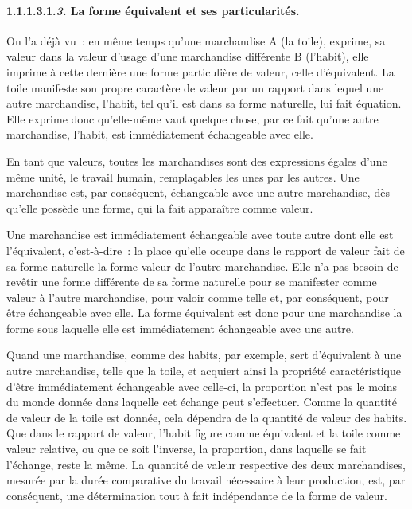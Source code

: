 \documentclass[french,twoside]{book} %
\begin{document}
\paragraph[{1.1.1.3.1.3. La forme équivalent et ses particularités.}]{1.1.1.3.1.\textbf{\emph{3}}. La forme équivalent et ses particularités.}
\noindent On l’a déjà vu : en même temps qu’une marchandise A (la toile), exprime, sa valeur dans la valeur d’usage d’une marchandise différente B (l’habit), elle imprime à cette dernière une forme particulière de valeur, celle d’équivalent. La toile manifeste son propre caractère de valeur par un rapport dans lequel une autre marchandise, l’habit, tel qu’il est dans sa forme naturelle, lui fait équation. Elle exprime donc qu’elle-même vaut quelque chose, par ce fait qu’une autre marchandise, l’habit, est immédiatement échangeable avec elle.\par
En tant que valeurs, toutes les marchandises sont des expressions égales d’une même unité, le travail humain, remplaçables les unes par les autres. Une marchandise est, par conséquent, échangeable avec une autre marchandise, dès qu’elle possède une forme, qui la fait apparaître comme valeur.\par
Une marchandise est immédiatement échangeable avec toute autre dont elle est l’équivalent, c’est-à-dire : la place qu’elle occupe dans le rapport de valeur fait de sa forme naturelle la forme valeur de l’autre marchandise. Elle n’a pas besoin de revêtir une forme différente de sa forme naturelle pour se manifester comme valeur à l’autre marchandise, pour valoir comme telle et, par conséquent, pour être échangeable avec elle. La forme équivalent est donc pour une marchandise la forme sous laquelle elle est immédiatement échangeable avec une autre.\par
Quand une marchandise, comme des habits, par exemple, sert d’équivalent à une autre marchandise, telle que la toile, et acquiert ainsi la propriété caractéristique d’être immédiatement échangeable avec celle-ci, la proportion n’est pas le moins du monde donnée dans laquelle cet échange peut s’effectuer. Comme la quantité de valeur de la toile est donnée, cela dépendra de la quantité de valeur des habits. Que dans le rapport de valeur, l’habit figure comme équivalent et la toile comme valeur relative, ou que ce soit l’inverse, la proportion, dans laquelle se fait l’échange, reste la même. La quantité de valeur respective des deux marchandises, mesurée par la durée comparative du travail nécessaire à leur production, est, par conséquent, une détermination tout à fait indépendante de la forme de valeur.\par
\end{document}
